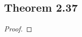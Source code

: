 \documentclass[../../main.tex]{subfiles}
\begin{document}
\subsection{Theorem 2.37}
\begin{wts}

\end{wts}
\begin{proof}

\end{proof}
\end{document}
